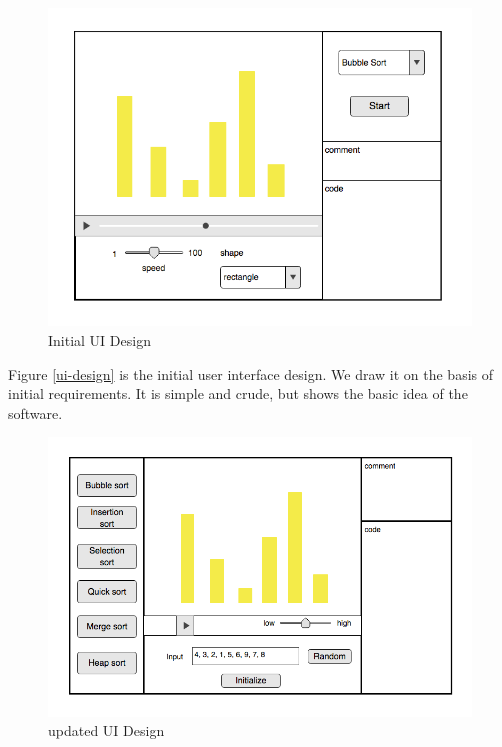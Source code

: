 \documentclass[paper=a4, fontsize=11pt,twoside]{scrartcl}		%
\begin{document}
\begin{figure}[htbp]
\centering
\includegraphics[width=.6\textwidth,height=.4\textwidth]{initialdesign.png}
\caption{Initial UI Design}
\label{initial-design}
\end{figure}

Figure \ref{ui-design} is the initial user interface design. We draw it on the basis of initial requirements. It is simple and crude, but shows the basic idea of the software.

\begin{figure}[htbp]
\centering
\includegraphics[width=.6\textwidth,height=.4\textwidth]{updateddesign.png}
\caption{updated UI Design}
\label{updated-design}
\end{figure}


\cleardoublepage



\end{document}
